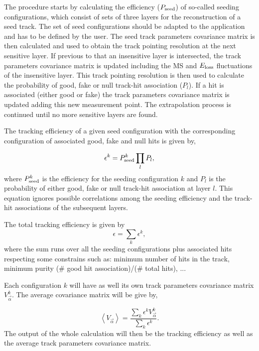 The procedure starts by calculating the efficiency ($P_{\rm seed}$) of so-called seeding configurations, which consist of sets of three layers for the reconstruction of a seed 
track. The set of seed configurations should be adapted to the application and has to be defined by the user. The seed track parameters covariance matrix is then calculated and 
used to obtain the track pointing resolution at the next sensitive layer. If previous to that an insensitive layer is intersected, the track parameters covariance matrix is updated 
including the MS and $E_{\rm loss}$ fluctuations of the insensitive layer. This track pointing resolution is then used to calculate the probability of good, fake or null track-hit 
association ($P_l$). If a hit is associated (either good or fake) the track parameters covariance matrix is updated adding this new measurement point. The extrapolation process is 
continued until no more sensitive layers are found.

The tracking efficiency of a given seed configuration with the corresponding configuration of associated good, fake and null hits is given by,

\begin{equation}
 \epsilon^k = P^k_{\rm seed} \prod_l P_l,
\end{equation}
\noindent
where $P^k_{\rm seed}$ is the efficiency for the seeding configuration $k$ and $P_l$ is the probability of either good, fake or null track-hit association at layer $l$. This equation 
ignores possible correlations among the seeding efficiency and the track-hit associations of the subsequent layers.

The total tracking efficiency is given by
\begin{equation}
 \epsilon = \sum_k \epsilon^k,
\end{equation}
\noindent
where the sum runs over all the seeding configurations plus associated hits respecting some constrains such as: minimum number of hits in the track, minimum purity 
(\# good hit association)/(\# total hits), ...

Each configuration $k$ will have as well its own track parameters covariance matrix $V^k_{\vec{\alpha}}$. The average covariance matrix will be give by,

\begin{equation}
 \left< V_{\vec{\alpha}} \right>  = \frac{\sum_k \epsilon^k V^k_{\vec{\alpha}} } { \sum_k \epsilon^k }.
\end{equation}
\noindent
The output of the whole calculation will then be the tracking efficiency as well as the average track parameters covariance matrix.

